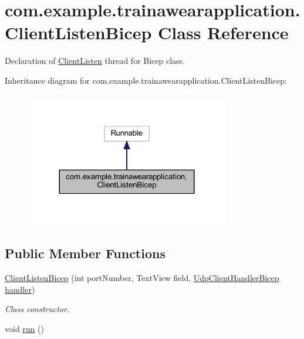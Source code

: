 \hypertarget{classcom_1_1example_1_1trainawearapplication_1_1_client_listen_bicep}{}\section{com.\+example.\+trainawearapplication.\+Client\+Listen\+Bicep Class Reference}
\label{classcom_1_1example_1_1trainawearapplication_1_1_client_listen_bicep}


Declaration of \mbox{\hyperlink{classcom_1_1example_1_1trainawearapplication_1_1_client_listen}{Client\+Listen}} thread for Bicep class.  




Inheritance diagram for com.\+example.\+trainawearapplication.\+Client\+Listen\+Bicep\+:
\nopagebreak
\begin{figure}[H]
\begin{center}
\leavevmode
\includegraphics[width=252pt]{classcom_1_1example_1_1trainawearapplication_1_1_client_listen_bicep__inherit__graph}
\end{center}
\end{figure}
\subsection*{Public Member Functions}
\begin{DoxyCompactItemize}
\item 
\mbox{\hyperlink{classcom_1_1example_1_1trainawearapplication_1_1_client_listen_bicep_a7a29935d4f0dd55a5dd0c0f5f93eba8c}{Client\+Listen\+Bicep}} (int port\+Number, Text\+View field, \mbox{\hyperlink{classcom_1_1example_1_1trainawearapplication_1_1_udp_client_handler_bicep}{Udp\+Client\+Handler\+Bicep}} \mbox{\hyperlink{classcom_1_1example_1_1trainawearapplication_1_1_client_listen_bicep_a2df86596d25028c0c93c195e2ca8b695}{handler}})
\begin{DoxyCompactList}\small\item\em Class constructor. \end{DoxyCompactList}\item 
void \mbox{\hyperlink{classcom_1_1example_1_1trainawearapplication_1_1_client_listen_bicep_a00c62e73027050af19a527f480a9be15}{run}} ()
\end{DoxyCompactItemize}
